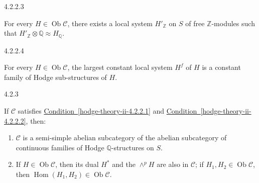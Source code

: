     \begin{condition}{4.2.2.3}\label{hodge-theory-ii-4.2.2.3}\skipsinglepar\par{}For every \(H\in \operatorname {Ob}\mathcal {C}\), there exists a local system \(H'_\mathbb {Z}\) on \(S\) of free \(\mathbb {Z}\)-modules such that \(H'_\mathbb {Z}\otimes \mathbb {Q}\approx  H_\mathbb {Q}\).\end{condition}

    \begin{condition}{4.2.2.4}\label{hodge-theory-ii-4.2.2.4}\skipsinglepar\par{}For every \(H\in \operatorname {Ob}\mathcal {C}\), the largest constant local system \(H^f\) of \(H\) is a constant family of Hodge sub-structures of \(H\).\end{condition}\begin{lemma}{4.2.3}\label{hodge-theory-ii-4.2.3}\skipsinglepar\par{}If \(\mathcal {C}\) satisfies \hyperref[hodge-theory-ii-4.2.2.1]{Condition~\ref*{hodge-theory-ii-4.2.2.1}} and \hyperref[hodge-theory-ii-4.2.2.2]{Condition~\ref*{hodge-theory-ii-4.2.2.2}}, then:

    
 \begin{enumerate}
      
 \item[(i)]
        \(\mathcal {C}\) is a semi-simple abelian subcategory of the abelian subcategory of continuous families of Hodge \(\mathbb {Q}\)-structures on \(S\).
      

      
 \item[(ii)]
        If \(H\in \operatorname {Ob}\mathcal {C}\), then its dual \(H^*\) and the \(\wedge ^p H\) are also in \(\mathcal {C}\);
        if \(H_1,H_2\in \operatorname {Ob}\mathcal {C}\), then \(\operatorname {Hom}(H_1,H_2)\in \operatorname {Ob}\mathcal {C}\).
      


\end{enumerate}
\end{lemma}
